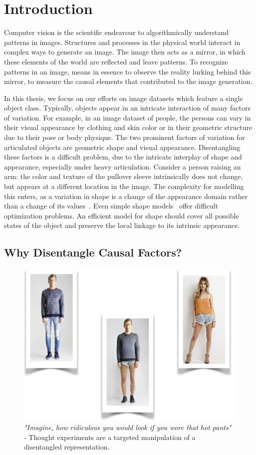 \chapter{Introduction}\label{sec:introduction}
	Computer vision is the scientific endeavour to algorithmically understand patterns in images.
	Structures and processes in the physical world interact in complex ways to generate an image. The image then acts as a mirror, in which these elements of the world are reflected and leave patterns.
	To recognize patterns in an image, means in essence to observe the reality lurking behind this mirror, \ie to measure the causal elements that contributed to the image generation.

	In this thesis, we focus on our efforts on image datasets which feature a single object class.
	Typically, objects appear in an intricate interaction of many factors of variation.
	For example, in an image dataset of people, the persons can vary in their visual appearance by clothing and skin color or in their geometric structure due to their pose or body physique.
	The two prominent factors of variation for articulated objects are geometric shape and visual appearance.
	Disentangling these factors is a difficult problem, due to the intricate interplay of shape and appearance, especially under heavy articulation.
	Consider a person raising an arm: the color and texture of the pullover sleeve intrinsically does not change, but appears at a different location in the image.
	The complexity for modelling this enters, as a variation in shape is a change of the appearance domain rather than a change of its values~\cite{shu18shapeappear}. Even simple shape models~\cite{cootes98activeappear} offer difficult optimization problems.
	An efficient model for shape should cover all possible states of the object and preserve the local linkage to its intrinsic appearance.

\section{Why Disentangle Causal Factors?}
	\begin{figure}[htp]
		\centering
		\includegraphics[trim={0cm 0cm 0cm 0cm},clip, width=0.5\linewidth]{fig/other/hotpants}
		\caption{\textit{"Imagine, how ridiculous you would look if you wore that hot pants"} - Thought experiments are a targeted manipulation of a disentangled representation.}
		\label{fig:hotpants}
	\end{figure}

